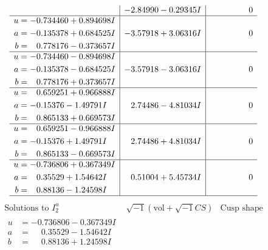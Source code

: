 \documentclass[1p]{elsarticle_modified}
\theoremstyle{definition}
\newcommand{\I}{\sqrt{-1}}
\begin{document}
$$\begin{array}{c|c|c}
 & -2.84990 - 0.29345 I & \phantom{-0.000000 } 0 \\ \hline\begin{aligned}
u &= -0.734460 + 0.894698 I \\
a &= -0.135378 + 0.684525 I \\
b &= \phantom{-}0.778176 - 0.373657 I\end{aligned}
 & -3.57918 + 3.06316 I & \phantom{-0.000000 } 0 \\ \hline\begin{aligned}
u &= -0.734460 - 0.894698 I \\
a &= -0.135378 - 0.684525 I \\
b &= \phantom{-}0.778176 + 0.373657 I\end{aligned}
 & -3.57918 - 3.06316 I & \phantom{-0.000000 } 0 \\ \hline\begin{aligned}
u &= \phantom{-}0.659251 + 0.966888 I \\
a &= -0.15376 - 1.49791 I \\
b &= \phantom{-}0.865133 + 0.669573 I\end{aligned}
 & \phantom{-}2.74486 - 4.81034 I & \phantom{-0.000000 } 0 \\ \hline\begin{aligned}
u &= \phantom{-}0.659251 - 0.966888 I \\
a &= -0.15376 + 1.49791 I \\
b &= \phantom{-}0.865133 - 0.669573 I\end{aligned}
 & \phantom{-}2.74486 + 4.81034 I & \phantom{-0.000000 } 0 \\ \hline\begin{aligned}
u &= -0.736806 + 0.367349 I \\
a &= \phantom{-}0.35529 + 1.54642 I \\
b &= \phantom{-}0.88136 - 1.24598 I\end{aligned}
 & \phantom{-}0.51004 + 5.45734 I & \phantom{-0.000000 } 0\\
 \hline 
 \end{array}$$\newpage$$\begin{array}{c|c|c}  
\text{Solutions to }I^u_{2}& \I (\text{vol} + \sqrt{-1}CS) & \text{Cusp shape}\\
 \hline 
\begin{aligned}
u &= -0.736806 - 0.367349 I \\
a &= \phantom{-}0.35529 - 1.54642 I \\
b &= \phantom{-}0.88136 + 1.24598 I\end{aligned}

\end{array}$$
\end{document}
